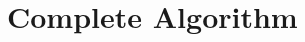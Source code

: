 \documentclass{article}
\begin{document}


\newpage
\section{Complete Algorithm}\label{sec:algorithm}
\end{document}
